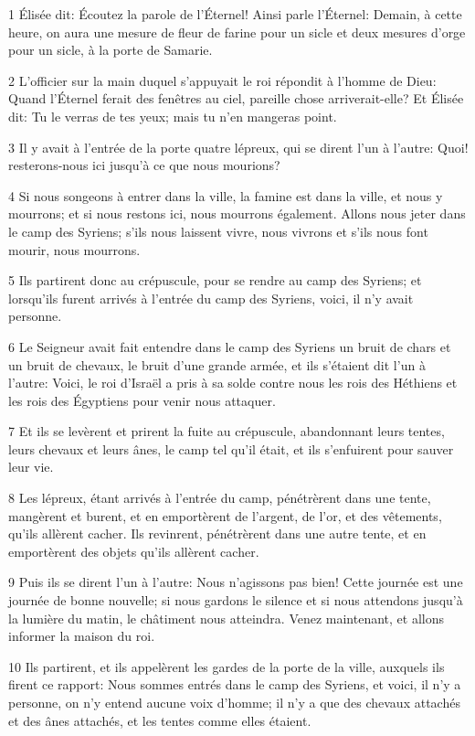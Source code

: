 \par 1 Élisée dit: Écoutez la parole de l'Éternel! Ainsi parle l'Éternel: Demain, à cette heure, on aura une mesure de fleur de farine pour un sicle et deux mesures d'orge pour un sicle, à la porte de Samarie.
\par 2 L'officier sur la main duquel s'appuyait le roi répondit à l'homme de Dieu: Quand l'Éternel ferait des fenêtres au ciel, pareille chose arriverait-elle? Et Élisée dit: Tu le verras de tes yeux; mais tu n'en mangeras point.
\par 3 Il y avait à l'entrée de la porte quatre lépreux, qui se dirent l'un à l'autre: Quoi! resterons-nous ici jusqu'à ce que nous mourions?
\par 4 Si nous songeons à entrer dans la ville, la famine est dans la ville, et nous y mourrons; et si nous restons ici, nous mourrons également. Allons nous jeter dans le camp des Syriens; s'ils nous laissent vivre, nous vivrons et s'ils nous font mourir, nous mourrons.
\par 5 Ils partirent donc au crépuscule, pour se rendre au camp des Syriens; et lorsqu'ils furent arrivés à l'entrée du camp des Syriens, voici, il n'y avait personne.
\par 6 Le Seigneur avait fait entendre dans le camp des Syriens un bruit de chars et un bruit de chevaux, le bruit d'une grande armée, et ils s'étaient dit l'un à l'autre: Voici, le roi d'Israël a pris à sa solde contre nous les rois des Héthiens et les rois des Égyptiens pour venir nous attaquer.
\par 7 Et ils se levèrent et prirent la fuite au crépuscule, abandonnant leurs tentes, leurs chevaux et leurs ânes, le camp tel qu'il était, et ils s'enfuirent pour sauver leur vie.
\par 8 Les lépreux, étant arrivés à l'entrée du camp, pénétrèrent dans une tente, mangèrent et burent, et en emportèrent de l'argent, de l'or, et des vêtements, qu'ils allèrent cacher. Ils revinrent, pénétrèrent dans une autre tente, et en emportèrent des objets qu'ils allèrent cacher.
\par 9 Puis ils se dirent l'un à l'autre: Nous n'agissons pas bien! Cette journée est une journée de bonne nouvelle; si nous gardons le silence et si nous attendons jusqu'à la lumière du matin, le châtiment nous atteindra. Venez maintenant, et allons informer la maison du roi.
\par 10 Ils partirent, et ils appelèrent les gardes de la porte de la ville, auxquels ils firent ce rapport: Nous sommes entrés dans le camp des Syriens, et voici, il n'y a personne, on n'y entend aucune voix d'homme; il n'y a que des chevaux attachés et des ânes attachés, et les tentes comme elles étaient.

